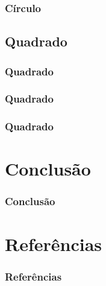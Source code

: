 \documentclass[aspectratio=169]{beamer}
\begin{document}
\begin{frame}
\frametitle{Círculo}
\end{frame}

\subsection{Quadrado}
\begin{frame}
\frametitle{Quadrado}
\end{frame}

\begin{frame}
\frametitle{Quadrado}
\end{frame}

\begin{frame}
\frametitle{Quadrado}
\end{frame}

\section{Conclusão}
\begin{frame}
\frametitle{Conclusão}
\end{frame}

\section{Referências}
\begin{frame}
\frametitle{Referências}
\end{frame}
\end{document}
